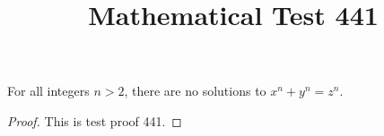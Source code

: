 \documentclass{amsart}
\begin{document}
\title{Mathematical Test 441}
\begin{theorem}
For all integers $n > 2$, there are no solutions to $x^n + y^n = z^n$.
\end{theorem}
\begin{proof}
This is test proof 441.
\end{proof}
\end{document}
